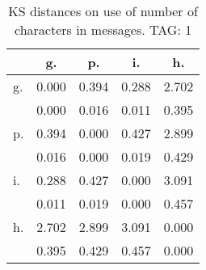 \begin{table}[h!]
\begin{center}
\begin{tabular}{| l | c | c | c | c |}\hline
 & g. & p. & i. & h. \\\hline
g. & 0.000  & 0.394  & 0.288  & 2.702 \\\hline
 & 0.000  & 0.016  & 0.011  & 0.395 \\\hline
p. & 0.394  & 0.000  & 0.427  & 2.899 \\\hline
 & 0.016  & 0.000  & 0.019  & 0.429 \\\hline
i. & 0.288  & 0.427  & 0.000  & 3.091 \\\hline
 & 0.011  & 0.019  & 0.000  & 0.457 \\\hline
h. & 2.702  & 2.899  & 3.091  & 0.000 \\\hline
 & 0.395  & 0.429  & 0.457  & 0.000 \\\hline
\end{tabular}
\caption{KS distances on use of number of characters in messages. TAG: 1}
\end{center}
\end{table}